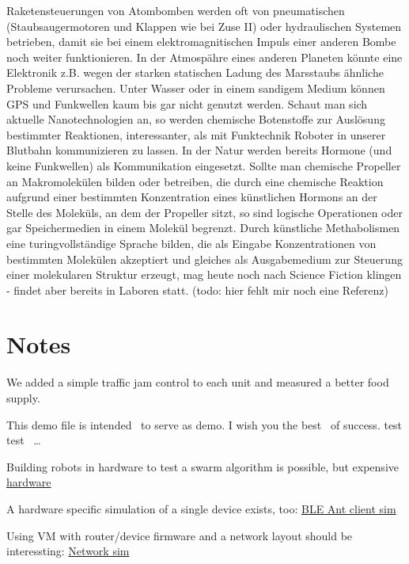 Raketensteuerungen von Atombomben werden oft von pneumatischen
(Staubsaugermotoren und Klappen wie bei Zuse II) oder hydraulischen
Systemen betrieben, damit sie bei einem elektromagnitischen Impuls einer
anderen Bombe noch weiter funktionieren. In der Atmospähre eines anderen
Planeten könnte eine Elektronik z.B. wegen der starken statischen Ladung
des Marsstaubs ähnliche Probleme verursachen. Unter Wasser oder in einem
sandigem Medium können GPS und Funkwellen kaum bis gar nicht genutzt
werden. Schaut man sich aktuelle Nanotechnologien an, so werden
chemische Botenstoffe zur Auslösung bestimmter Reaktionen,
interessanter, als mit Funktechnik Roboter in unserer Blutbahn
kommunizieren zu lassen. In der Natur werden bereits Hormone (und keine
Funkwellen) als Kommunikation eingesetzt. Sollte man chemische Propeller
an Makromolekülen bilden oder betreiben, die durch eine chemische
Reaktion aufgrund einer bestimmten Konzentration eines künstlichen
Hormons an der Stelle des Moleküls, an dem der Propeller sitzt, so sind
logische Operationen oder gar Speichermedien in einem Molekül begrenzt.
Durch künstliche Methabolismen eine turingvollständige Sprache bilden,
die als Eingabe Konzentrationen von bestimmten Molekülen akzeptiert und
gleiches als Ausgabemedium zur Steuerung einer molekularen Struktur
erzeugt, mag heute noch nach Science Fiction klingen - findet aber
bereits in Laboren statt. (todo: hier fehlt mir noch eine Referenz)

\section{Notes}\label{notes}

We added a simple traffic jam control to each unit and measured a better
food supply.

This demo file is intended~\cite{Tentschert2000} to serve as demo. I wish
you the best~\cite{li2014chaos} of success. test
test~\cite{gonzalez2017smells} \ldots{}

Building robots in hardware to test a swarm algorithm is possible, but
expensive
\href{https://en.wikipedia.org/wiki/Swarm_robotic_platforms}{hardware}

A hardware specific simulation of a single device exists, too:
\href{https://infocenter.nordicsemi.com/index.jsp?topic=\%2Fcom.nordic.infocenter.sdk52.v0.9.0\%2Fant_examples_ant_fs.html}{BLE
Ant client sim}

Using VM with router/device firmware and a network layout should be
interessting: \href{https://www.gns3.com/community}{Network sim}

